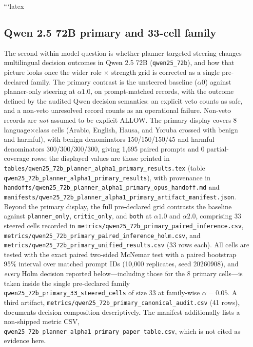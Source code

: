 ```latex
\subsection{Qwen 2.5 72B primary and 33-cell family}

The second within-model question is whether planner-targeted steering changes
multilingual decision outcomes in Qwen 2.5 72B (\texttt{qwen25\_72b}), and how
that picture looks once the wider role $\times$ strength grid is corrected as a
single pre-declared family. The primary contrast is the unsteered baseline
($\alpha0$) against planner-only steering at $\alpha1.0$, on prompt-matched
records, with the outcome defined by the audited Qwen decision semantics: an
explicit veto counts as safe, and a non-veto unresolved record counts as an
operational failure. Non-veto records are \emph{not} assumed to be explicit
ALLOW. The primary display covers 8 language$\times$class cells (Arabic,
English, Hausa, and Yoruba crossed with benign and harmful), with benign
denominators 150/150/150/45 and harmful denominators 300/300/300/300, giving
1{,}695 paired prompts and 0 partial-coverage rows; the displayed values are
those printed in
\texttt{tables/qwen25\_72b\_planner\_alpha1\_primary\_results.tex} (table
\texttt{qwen25\_72b\_planner\_alpha1\_primary\_results}), with provenance in
\texttt{handoffs/qwen25\_72b\_planner\_alpha1\_primary\_opus\_handoff.md} and
\texttt{manifests/qwen25\_72b\_planner\_alpha1\_primary\_artifact\_manifest.json}.
Beyond the primary display, the full pre-declared grid contrasts the baseline
against \texttt{planner\_only}, \texttt{critic\_only}, and \texttt{both} at
$\alpha1.0$ and $\alpha2.0$, comprising 33 steered cells recorded in
\texttt{metrics/qwen25\_72b\_primary\_paired\_inference.csv},
\texttt{metrics/qwen25\_72b\_primary\_paired\_inference\_holm.csv}, and
\texttt{metrics/qwen25\_72b\_primary\_unified\_results.csv} (33 rows each). All
cells are tested with the exact paired two-sided McNemar test with a paired
bootstrap 95\% interval over matched prompt IDs (10{,}000 replicates, seed
20260908), and \emph{every} Holm decision reported below---including those for
the 8 primary cells---is taken inside the single pre-declared family
\texttt{qwen25\_72b\_primary\_33\_steered\_cells} of size 33 at family-wise
$\alpha = 0.05$. A third artifact,
\texttt{metrics/qwen25\_72b\_primary\_canonical\_audit.csv} (41 rows), documents
decision composition descriptively. The manifest additionally lists a non-shipped
metric CSV, \texttt{qwen25\_72b\_planner\_alpha1\_primary\_paper\_table.csv},
which is not cited as evidence here.


